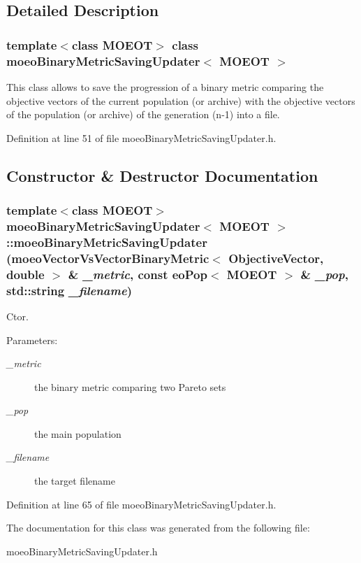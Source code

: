 \subsection{Detailed Description}
\subsubsection*{template$<$class MOEOT$>$ class moeo\-Binary\-Metric\-Saving\-Updater$<$ MOEOT $>$}

This class allows to save the progression of a binary metric comparing the objective vectors of the current population (or archive) with the objective vectors of the population (or archive) of the generation (n-1) into a file. 



Definition at line 51 of file moeo\-Binary\-Metric\-Saving\-Updater.h.

\subsection{Constructor \& Destructor Documentation}
\subsubsection{\setlength{\rightskip}{0pt plus 5cm}template$<$class MOEOT$>$ \bf{moeo\-Binary\-Metric\-Saving\-Updater}$<$ MOEOT $>$::\bf{moeo\-Binary\-Metric\-Saving\-Updater} (\bf{moeo\-Vector\-Vs\-Vector\-Binary\-Metric}$<$ \bf{Objective\-Vector}, double $>$ \& {\em \_\-metric}, const \bf{eo\-Pop}$<$ MOEOT $>$ \& {\em \_\-pop}, std::string {\em \_\-filename})\hspace{0.3cm}{\tt  [inline]}}\label{classmoeoBinaryMetricSavingUpdater_b7c3fb73caf759450367c76d4716bb62}


Ctor. 

\begin{Desc}
\item[Parameters:]
\begin{description}
\item[{\em \_\-metric}]the binary metric comparing two Pareto sets \item[{\em \_\-pop}]the main population \item[{\em \_\-filename}]the target filename \end{description}
\end{Desc}


Definition at line 65 of file moeo\-Binary\-Metric\-Saving\-Updater.h.

The documentation for this class was generated from the following file:\begin{CompactItemize}
\item 
moeo\-Binary\-Metric\-Saving\-Updater.h\end{CompactItemize}
